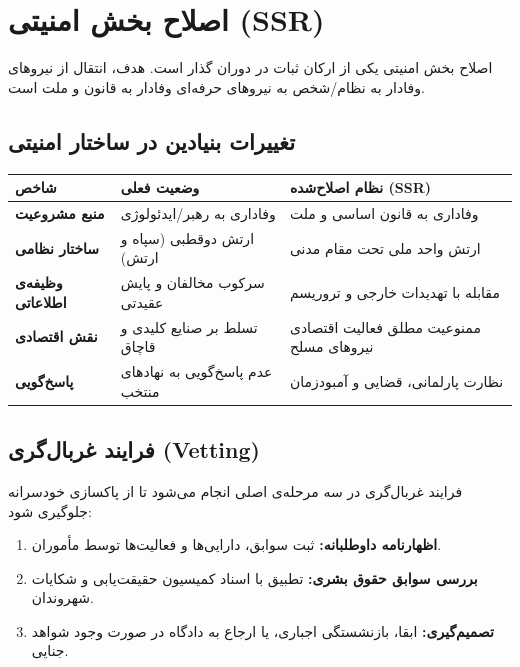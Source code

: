 \chapter{اصلاح بخش امنیتی (SSR)}
\label{app:ssr}

اصلاح بخش امنیتی یکی از ارکان ثبات در دوران گذار است. هدف، انتقال از نیروهای وفادار به نظام/شخص به نیروهای حرفه‌ای وفادار به قانون و ملت است.

\section{تغییرات بنیادین در ساختار امنیتی}

\begin{center}
\begin{tabular}{R{4.5cm} R{4.5cm} L{5cm}}
\hline
\textbf{شاخص} & \textbf{وضعیت فعلی} & \textbf{نظام اصلاح‌شده (SSR)} \\
\hline
\textbf{منبع مشروعیت} & وفاداری به رهبر/ایدئولوژی & وفاداری به قانون اساسی و ملت \\
\textbf{ساختار نظامی} & ارتش دوقطبی (سپاه و ارتش) & ارتش واحد ملی تحت مقام مدنی \\
\textbf{وظیفه‌ی اطلاعاتی} & سرکوب مخالفان و پایش عقیدتی & مقابله با تهدیدات خارجی و تروریسم \\
\textbf{نقش اقتصادی} & تسلط بر صنایع کلیدی و قاچاق & ممنوعیت مطلق فعالیت اقتصادی نیروهای مسلح \\
\textbf{پاسخ‌گویی} & عدم پاسخ‌گویی به نهادهای منتخب & نظارت پارلمانی، قضایی و آمبودزمان \\
\hline
\end{tabular}
\end{center}

\section{فرایند غربال‌گری (Vetting)}

فرایند غربال‌گری در سه مرحله‌ی اصلی انجام می‌شود تا از پاکسازی خودسرانه جلوگیری شود:

\begin{enumerate}
    \item \textbf{اظهارنامه داوطلبانه:} ثبت سوابق، دارایی‌ها و فعالیت‌ها توسط مأموران.
    \item \textbf{بررسی سوابق حقوق بشری:} تطبیق با اسناد کمیسیون حقیقت‌یابی و شکایات شهروندان.
    \item \textbf{تصمیم‌گیری:} ابقا، بازنشستگی اجباری، یا ارجاع به دادگاه در صورت وجود شواهد جنایی.
\end{enumerate}

